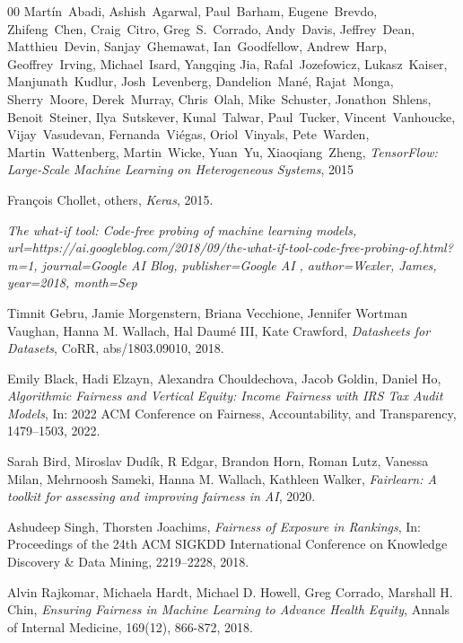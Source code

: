 \documentclass[fleqn,10pt]{wlscirep}
\begin{document}
\begin{thebibliography}{00}
  Mart\'{i}n~Abadi, Ashish~Agarwal, Paul~Barham, Eugene~Brevdo, Zhifeng~Chen, Craig~Citro, Greg~S.~Corrado, Andy~Davis, Jeffrey~Dean, Matthieu~Devin, Sanjay~Ghemawat, Ian~Goodfellow, Andrew~Harp, Geoffrey~Irving, Michael~Isard, Yangqing Jia, Rafal~Jozefowicz, Lukasz~Kaiser, Manjunath~Kudlur, Josh~Levenberg, Dandelion~Man\'{e}, Rajat~Monga, Sherry~Moore, Derek~Murray, Chris~Olah, Mike~Schuster, Jonathon~Shlens, Benoit~Steiner, Ilya~Sutskever, Kunal~Talwar, Paul~Tucker, Vincent~Vanhoucke, Vijay~Vasudevan, Fernanda~Vi\'{e}gas, Oriol~Vinyals, Pete~Warden, Martin~Wattenberg, Martin~Wicke, Yuan~Yu, Xiaoqiang~Zheng,
  \textit{{TensorFlow}: Large-Scale Machine Learning on Heterogeneous Systems},
  {2015}   %


  Fran\c{c}ois Chollet, others,
  \textit{Keras},
  2015.


  \textit{{The what-if tool: Code-free probing of machine learning models}, url={https://ai.googleblog.com/2018/09/the-what-if-tool-code-free-probing-of.html?m=1}, journal={Google AI Blog}, publisher={Google AI }, author={Wexler, James}, year={2018}, month={Sep}}  %
  


  Timnit Gebru, Jamie Morgenstern, Briana Vecchione, Jennifer Wortman Vaughan, Hanna M. Wallach, Hal Daum\'{e} III, Kate Crawford,
  \textit{Datasheets for Datasets},
  CoRR,
  abs/1803.09010,
  2018.


  Emily Black, Hadi Elzayn, Alexandra Chouldechova, Jacob Goldin, Daniel Ho,
  \textit{Algorithmic Fairness and Vertical Equity: Income Fairness with IRS Tax Audit Models},
  In: 2022 ACM Conference on Fairness, Accountability, and Transparency,
  1479–1503,
  2022.


  Sarah Bird, Miroslav Dud\'ik, R Edgar, Brandon Horn, Roman Lutz, Vanessa Milan, Mehrnoosh Sameki, Hanna M. Wallach, Kathleen Walker,
  \textit{Fairlearn: A toolkit for assessing and improving fairness in AI},
  2020.


  Ashudeep Singh, Thorsten Joachims,
  \textit{Fairness of Exposure in Rankings},
  In: Proceedings of the 24th ACM SIGKDD International Conference on Knowledge Discovery \& Data Mining,
  2219–2228,
  2018.


  Alvin Rajkomar, Michaela Hardt, Michael D. Howell, Greg Corrado, Marshall H. Chin,
  \textit{Ensuring Fairness in Machine Learning to Advance Health Equity},
  Annals of Internal Medicine,
  169(12),
  866-872,
  2018.



\end{thebibliography}
\end{document}
